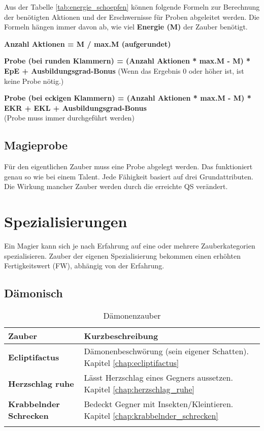 Aus der Tabelle \ref{tab:energie_schoepfen} können folgende Formeln zur Berechnung der benötigten Aktionen und der Erschwernisse für Proben abgeleitet werden. Die Formeln hängen immer davon ab, wie viel \textbf{Energie (M)} der Zauber benötigt.

\textbf{Anzahl Aktionen = M / max.M (aufgerundet)} 

\textbf{Probe (bei runden Klammern) = (Anzahl Aktionen * max.M - M) * EpE + Ausbildungsgrad-Bonus} 
(Wenn das Ergebnis 0 oder höher ist, ist keine Probe nötig.) 

\textbf{Probe (bei eckigen Klammern) = (Anzahl Aktionen * max.M - M) * EKR + EKL + Ausbildungsgrad-Bonus} \\
(Probe muss immer durchgeführt werden) 

\subsection{Magieprobe}
\label{chap:magieprobe}
Für den eigentlichen Zauber muss eine Probe abgelegt werden. Das funktioniert genau so wie bei einem Talent. Jede Fähigkeit basiert auf drei Grundattributen. Die Wirkung mancher Zauber werden durch die erreichte QS verändert.


\section{Spezialisierungen}
Ein Magier kann sich je nach Erfahrung auf eine oder mehrere Zauberkategorien spezialisieren. Zauber der eigenen Spezialisierung bekommen einen erhöhten Fertigkeitswert (FW), abhängig von der Erfahrung.

\subsection{Dämonisch}
\begin{longtable}{|p{5cm}|p{10cm}|}
\hline
\textbf{Zauber} & \textbf{Kurzbeschreibung} \\ \hline

\textbf{Ecliptifactus} & Dämonenbeschwörung (sein eigener Schatten). Kapitel \ref{chap:ecliptifactus} \\ \hline

\textbf{Herzschlag ruhe} & Lässt Herzschlag eines Gegners aussetzen. Kapitel \ref{chap:herzschlag_ruhe} \\ \hline

\textbf{Krabbelnder Schrecken} & Bedeckt Gegner mit Insekten/Kleintieren. Kapitel \ref{chap:krabbelnder_schrecken} \\ \hline

\caption{Dämonenzauber}
\label{tab:daemonenzauber}
\end{longtable}


